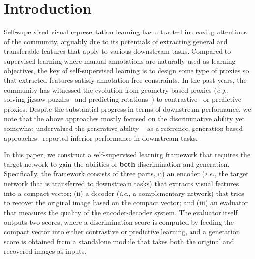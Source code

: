 \documentclass[10pt,twocolumn,letterpaper]{article}
\begin{document}
\section{Introduction}
\label{sec:intro}

Self-supervised visual representation learning has attracted increasing attentions of the community, arguably due to its potentials of extracting general and transferable features that apply to various downstream tasks. Compared to supervised learning where manual annotations are naturally used as learning objectives, the key of self-supervised learning is to design some type of proxies so that extracted features satisfy annotation-free constraints. In the past years, the community has witnessed the evolution from geometry-based proxies (\textit{e.g.}, solving jigsaw puzzles~\cite{jigsaw} and predicting rotations~\cite{rotation}) to contrastive~\cite{chen2020simple, he2020momentum} or predictive~\cite{grill2020bootstrap,bao2021beit} proxies. Despite the substantial progress in terms of downstream performance, we note that the above approaches mostly focused on the discriminative ability yet somewhat undervalued the generative ability -- as a reference, generation-based approaches~\cite{inpainting,aet} reported inferior performance in downstream tasks.

In this paper, we construct a self-supervised learning framework that requires the target network to gain the abilities of \textbf{both} discrimination and generation. Specifically, the framework consists of three parts, (i) an encoder (\textit{i.e.}, the target network that is transferred to downstream tasks) that extracts visual features into a compact vector; (ii) a decoder (\textit{i.e.}, a complementary network) that tries to recover the original image based on the compact vector; and (iii) an evaluator that measures the quality of the encoder-decoder system. The evaluator itself outputs two scores, where a discrimination score is computed by feeding the compact vector into either contrastive or predictive learning, and a generation score is obtained from a standalone module that takes both the original and recovered images as inputs.
\end{document}
